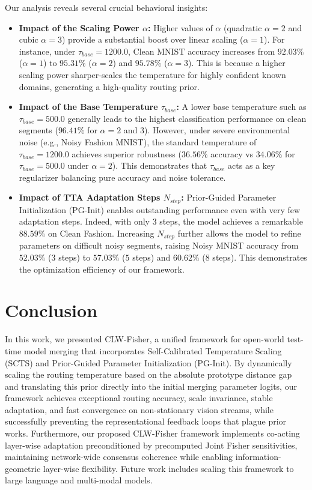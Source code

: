 \documentclass{article}
\theoremstyle{plain}
\theoremstyle{definition}
\theoremstyle{remark}
\begin{document}
Our analysis reveals several crucial behavioral insights:
\begin{itemize}
  \item \textbf{Impact of the Scaling Power $\alpha$:} Higher values of $\alpha$ (quadratic $\alpha=2$ and cubic $\alpha=3$) provide a substantial boost over linear scaling ($\alpha=1$). For instance, under $\tau_{base}=1200.0$, Clean MNIST accuracy increases from $92.03\%$ ($\alpha=1$) to $95.31\%$ ($\alpha=2$) and $95.78\%$ ($\alpha=3$). This is because a higher scaling power sharper-scales the temperature for highly confident known domains, generating a high-quality routing prior.
  \item \textbf{Impact of the Base Temperature $\tau_{base}$:} A lower base temperature such as $\tau_{base}=500.0$ generally leads to the highest classification performance on clean segments ($96.41\%$ for $\alpha=2$ and $3$). However, under severe environmental noise (e.g., Noisy Fashion MNIST), the standard temperature of $\tau_{base}=1200.0$ achieves superior robustness ($36.56\%$ accuracy vs $34.06\%$ for $\tau_{base}=500.0$ under $\alpha=2$). This demonstrates that $\tau_{base}$ acts as a key regularizer balancing pure accuracy and noise tolerance.
  \item \textbf{Impact of TTA Adaptation Steps $N_{step}$:} Prior-Guided Parameter Initialization (PG-Init) enables outstanding performance even with very few adaptation steps. Indeed, with only $3$ steps, the model achieves a remarkable $88.59\%$ on Clean Fashion. Increasing $N_{step}$ further allows the model to refine parameters on difficult noisy segments, raising Noisy MNIST accuracy from $52.03\%$ ($3$ steps) to $57.03\%$ ($5$ steps) and $60.62\%$ ($8$ steps). This demonstrates the optimization efficiency of our framework.
\end{itemize}

\section{Conclusion}
\label{sec:conclusion}
In this work, we presented CLW-Fisher, a unified framework for open-world test-time model merging that incorporates Self-Calibrated Temperature Scaling (SCTS) and Prior-Guided Parameter Initialization (PG-Init). By dynamically scaling the routing temperature based on the absolute prototype distance gap and translating this prior directly into the initial merging parameter logits, our framework achieves exceptional routing accuracy, scale invariance, stable adaptation, and fast convergence on non-stationary vision streams, while successfully preventing the representational feedback loops that plague prior works. Furthermore, our proposed CLW-Fisher framework implements co-acting layer-wise adaptation preconditioned by precomputed Joint Fisher sensitivities, maintaining network-wide consensus coherence while enabling information-geometric layer-wise flexibility. Future work includes scaling this framework to large language and multi-modal models.
\end{document}
